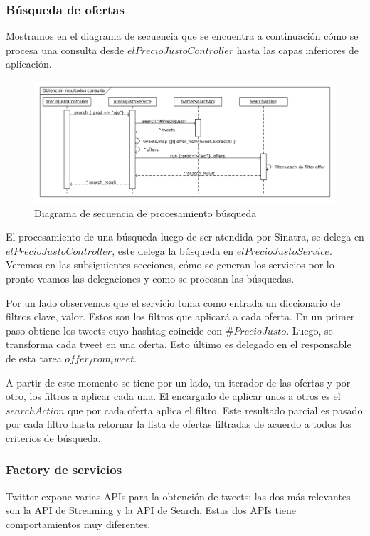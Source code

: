 \subsubsection{B\'usqueda de ofertas}

Mostramos en el diagrama de secuencia que se encuentra a continuaci\'on c\'omo se procesa una consulta desde $elPrecioJustoController$ hasta las capas inferiores de aplicaci\'on.

\begin{figure}[h]
\centerline{\includegraphics[width=0.6\paperwidth]{./imgs/sequence_searchAction.png}}
\caption{Diagrama de secuencia de procesamiento b\'usqueda}
\label{fig:sequence_search}
\end{figure}

El procesamiento de una b\'usqueda luego de ser atendida por Sinatra, se delega en $elPrecioJustoController$, este delega la b\'usqueda en $elPrecioJustoService$. Veremos en las subsiguientes secciones, c\'omo  se generan los servicios por lo pronto veamos las delegaciones y como se procesan las b\'usquedas.

Por un lado observemos que el servicio toma como entrada un diccionario de filtros clave, valor. Estos son los filtros que aplicar\'a a cada oferta.
En un primer paso obtiene los tweets cuyo hashtag coincide con $\#PrecioJusto$. Luego, se transforma cada tweet en una oferta. Esto \'ultimo es delegado en el responsable de esta tarea $offer_from_tweet$.

A partir de este momento se tiene por un lado, un iterador de las ofertas y por otro, los filtros a aplicar cada una. El encargado de aplicar unos a otros es el $searchAction$ que por cada oferta aplica el filtro. Este resultado parcial es pasado por cada filtro hasta retornar la lista de ofertas filtradas de acuerdo a todos los criterios de b\'usqueda.




\subsubsection{Factory de servicios}
Twitter expone varias APIs para la obtenci\'on de tweets; las dos m\'as relevantes son la API de Streaming y la API de Search. Estas dos APIs tiene comportamientos muy diferentes.

